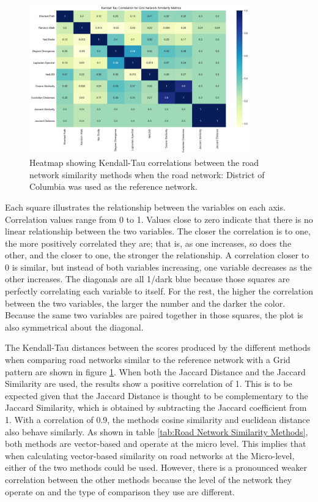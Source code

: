 \begin{figure}[!ht]
\centering
\includegraphics[width=0.85\textwidth,center]{picture/Grid/grid2.png}
\caption[Heatmap showing Kendall-Tau correlations between the road network similarity methods for Grid Road Networks]{Heatmap showing Kendall-Tau correlations between the road network similarity methods when the road network: District of Columbia was used as the reference network.}
\label{fig:network ranking}
\end{figure}

Each square illustrates the relationship between the variables on each axis. Correlation values range from 0 to 1. Values close to zero indicate that there is no linear relationship between the two variables. The closer the correlation is to one, the more positively correlated they are; that is, as one increases, so does the other, and the closer to one, the stronger the relationship. A correlation closer to 0 is similar, but instead of both variables increasing, one variable decreases as the other increases. The diagonals are all 1/dark blue because those squares are perfectly correlating each variable to itself. For the rest, the higher the correlation between the two variables, the larger the number and the darker the color. Because the same two variables are paired together in those squares, the plot is also symmetrical about the diagonal.

The Kendall-Tau distances between the scores produced by the different methods when comparing road networks similar to the reference network with a Grid pattern are shown in figure \ref{fig:network ranking}. When both the Jaccard Distance and the Jaccard Similarity are used, the results show a positive correlation of 1. This is to be expected given that the Jaccard Distance is thought to be complementary to the Jaccard Similarity, which is obtained by subtracting the Jaccard coefficient from 1. With a correlation of 0.9, the methods cosine similarity and euclidean distance also behave similarly. As shown in table \ref{tab:Road Network Similarity Methods}, both methods are vector-based and operate at the micro level. This implies that when calculating vector-based similarity on road networks at the Micro-level, either of the two methods could be used. However, there is a pronounced weaker correlation between the other methods because the level of the network they operate on and the type of comparison they use are different.

